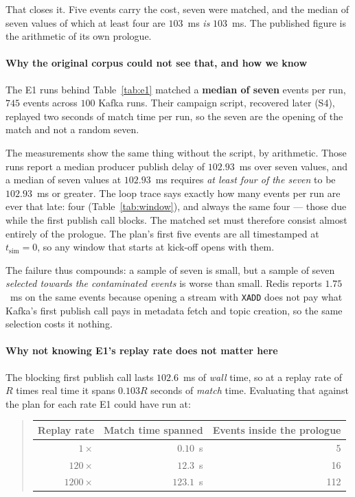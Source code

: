 \documentclass[10pt,journal,onecolumn]{IEEEtran}
\newcommand{\kafka}{Kafka}
\newcommand{\redis}{Redis}
\begin{document}
That closes it. Five events carry the cost, seven were matched, and the median of seven values of
which at least four are $103$~ms \emph{is} $103$~ms. The published figure is the arithmetic of
its own prologue.

\paragraph{Why the original corpus could not see that, and how we know} The E1 runs behind
Table~\ref{tab:e1} matched a \textbf{median of seven} events per run, $745$ events across $100$
\kafka{} runs. Their campaign script, recovered later (S4), replayed two seconds of match time
per run, so the seven are the opening of the match and not a random seven.

The measurements show the same thing without the script, by arithmetic. Those runs report a
median producer publish delay of $102.93$~ms over seven values, and a median of seven values at
$102.93$~ms requires \emph{at least four of the seven} to be $102.93$~ms or greater. The loop
trace says exactly how many events per run are ever that late: four (Table~\ref{tab:window}),
and always the same four --- those due while the first publish call blocks. The matched set must
therefore consist almost entirely of the prologue. The plan's first five events are all
timestamped at $t_{\mathrm{sim}}{=}0$, so any window that starts at kick-off opens with them.

The failure thus compounds: a sample of seven is small, but a sample of seven \emph{selected
towards the contaminated events} is worse than small. \redis{} reports $1.75$~ms on the same
events because opening a stream with \texttt{XADD} does not pay what \kafka{}'s first publish call pays
in metadata fetch and topic creation, so the same selection costs it nothing.

\paragraph{Why not knowing E1's replay rate does not matter here} The blocking first publish call lasts
$102.6$~ms of \emph{wall} time, so at a replay rate of $R$ times real time it spans $0.103R$
seconds of \emph{match} time. Evaluating that against the plan for each rate E1 could have run
at:

\begin{quote}
\small
\begin{tabular}{rrr}
\toprule
Replay rate & Match time spanned & Events inside the prologue \\
\midrule
$1\times$    & $0.10$~s   & 5 \\
$120\times$  & $12.3$~s   & 16 \\
$1200\times$ & $123.1$~s  & 112 \\
\bottomrule
\end{tabular}
\end{quote}
\end{document}
